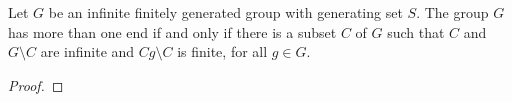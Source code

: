 \begin{definition}
    
\end{definition}

\begin{proposition}
Let \(G\) be an infinite finitely generated group with generating set \(S\).
The group \(G\) has more than one end if and only if there is a subset \(C\) of \(G\) such that \(C\) and \(G \setminus C\) are infinite and \(Cg \setminus C\) is finite, for all \(g \in G\).
\end{proposition}

\begin{proof}
    
\end{proof}
\newpage %